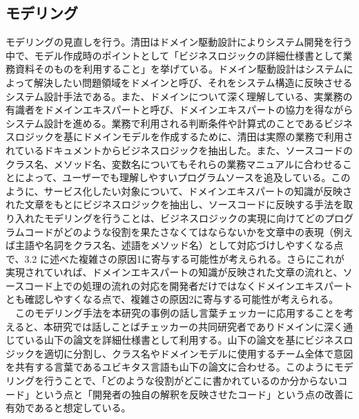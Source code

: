 \documentclass[12pt, a4paper]{jreport}
\begin{document}
\subsection{モデリング}
モデリングの見直しを行う。清田\cite{Domein}はドメイン駆動設計によりシステム開発を行う中で、モデル作成時のポイントとして「ビジネスロジックの詳細仕様書として業務資料そのものを利用すること」を挙げている。ドメイン駆動設計はシステムによって解決したい問題領域をドメインと呼び、それをシステム構造に反映させるシステム設計手法である。また、ドメインについて深く理解している、実業務の有識者をドメインエキスパートと呼び、ドメインエキスパートの協力を得ながらシステム設計を進める。業務で利用される判断条件や計算式のことであるビジネスロジックを基にドメインモデルを作成するために、清田は実際の業務で利用されているドキュメントからビジネスロジックを抽出した。また、ソースコードのクラス名、メソッド名、変数名についてもそれらの業務マニュアルに合わせることによって、ユーザーでも理解しやすいプログラムソースを追及している。このように、サービス化したい対象について、ドメインエキスパートの知識が反映された文章をもとにビジネスロジックを抽出し、ソースコードに反映する手法を取り入れたモデリングを行うことは、ビジネスロジックの実現に向けてどのプログラムコードがどのような役割を果たさなくてはならないかを文章中の表現（例えば主語や名詞をクラス名、述語をメソッド名）として対応づけしやすくなる点で、3.2 に述べた複雑さの原因1に寄与する可能性が考えられる。さらにこれが実現されていれば、ドメインエキスパートの知識が反映された文章の流れと、ソースコード上での処理の流れの対応を開発者だけではなくドメインエキスパートとも確認しやすくなる点で、複雑さの原因2に寄与する可能性が考えられる。
\\　このモデリング手法を本研究の事例の話し言葉チェッカーに応用することを考えると、本研究では話しことばチェッカーの共同研究者でありドメインに深く通じている山下の論文\cite{Yamashita}を詳細仕様書として利用する。山下の論文を基にビジネスロジックを適切に分割し、クラス名やドメインモデルに使用するチーム全体で意図を共有する言葉であるユビキタス言語も山下の論文に合わせる。このようにモデリングを行うことで、「どのような役割がどこに書かれているのか分からないコード」という点と「開発者の独自の解釈を反映させたコード」という点の改善に有効であると想定している。
\end{document}
